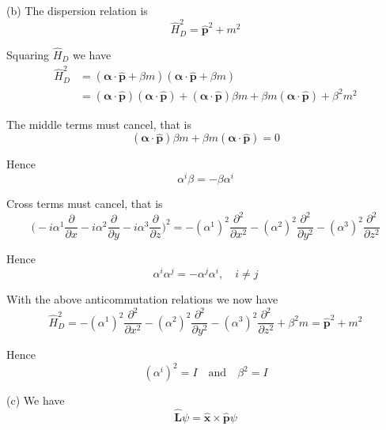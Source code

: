 (b) The dispersion relation is
\begin{equation*}
\hat H_D^2=\hat{\mathbf p}^2+m^2
\end{equation*}

Squaring $\hat H_D$ we have
\begin{align*}
\hat H_D^2
&=(\boldsymbol\alpha\cdot\hat{\mathbf p}+\beta m)(\boldsymbol\alpha\cdot\hat{\mathbf p}+\beta m)
\\
&=(\boldsymbol\alpha\cdot\hat{\mathbf p})(\boldsymbol\alpha\cdot\hat{\mathbf p})
+(\boldsymbol\alpha\cdot\hat{\mathbf p})\beta m+\beta m(\boldsymbol\alpha\cdot\hat{\mathbf p})+\beta^2m^2
\end{align*}

The middle terms must cancel, that is
\begin{equation*}
(\boldsymbol\alpha\cdot\hat{\mathbf p})\beta m+\beta m(\boldsymbol\alpha\cdot\hat{\mathbf p})=0
\end{equation*}

Hence
\begin{equation*}
\alpha^i\beta=-\beta\alpha^i
\end{equation*}

Cross terms must cancel, that is
\begin{equation*}
\bigg(
{-}i\alpha^1\frac{\partial}{\partial x}
-i\alpha^2\frac{\partial}{\partial y}
-i\alpha^3\frac{\partial}{\partial z}
\bigg)^2
=-(\alpha^1)^2\frac{\partial^2}{\partial x^2}
-(\alpha^2)^2\frac{\partial^2}{\partial y^2}
-(\alpha^3)^2\frac{\partial^2}{\partial z^2}
\end{equation*}

Hence
\begin{equation*}
\alpha^i\alpha^j=-\alpha^j\alpha^i,\quad i\ne j
\end{equation*}

With the above anticommutation relations we now have
\begin{equation*}
\hat H_D^2=-(\alpha^1)^2\frac{\partial^2}{\partial x^2}
-(\alpha^2)^2\frac{\partial^2}{\partial y^2}
-(\alpha^3)^2\frac{\partial^2}{\partial z^2}
+\beta^2m=\hat{\mathbf p}^2+m^2
\end{equation*}

Hence
\begin{equation*}
(\alpha^i)^2=I\quad\text{and}\quad\beta^2=I
\end{equation*}

(c) We have
\begin{equation*}
\hat{\mathbf L}\psi=\hat{\mathbf x}\times\hat{\mathbf p}\psi
\end{equation*}

